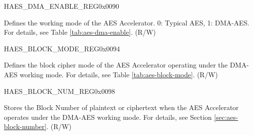 \begin{register}{H}{AES\_DMA\_ENABLE\_REG}{0x{}0090}\label{regdesc:AESDMAENABLEREG}
%
%
\regnewline%
\begin{regdesc}\begin{reglist}
\item [AES\_DMA\_ENABLE] Defines the working mode of the AES Accelerator. 0: Typical AES, 1: DMA-AES. For details, see Table \ref{tab:aes-dma-enable}. (R/W)
\end{reglist}\end{regdesc}
\end{register}


\begin{register}{H}{AES\_BLOCK\_MODE\_REG}{0x{}0094}\label{regdesc:AESBLOCKMODEREG}
%
%
\regnewline%
\begin{regdesc}\begin{reglist}
\item [AES\_BLOCK\_MODE] Defines the block cipher mode of the AES Accelerator operating under the DMA-AES working mode. For details, see Table \ref{tab:aes-block-mode}. (R/W)
\end{reglist}\end{regdesc}
\end{register}


\begin{register}{H}{AES\_BLOCK\_NUM\_REG}{0x{}0098}\label{regdesc:AESBLOCKNUMREG}
%
\regnewline%
\begin{regdesc}\begin{reglist}
\item [AES\_BLOCK\_NUM] Stores the Block Number of plaintext or ciphertext when the AES Accelerator operates under the DMA-AES working mode. For details, see Section \ref{sec:aes-block-number}. (R/W)
\end{reglist}\end{regdesc}
\end{register}


